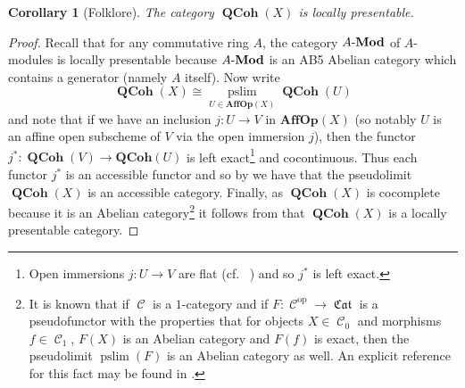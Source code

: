 \documentclass{amsart}
\newtheorem{corollary}[equation]{Corollary}
\theoremstyle{definition}
\DeclareMathOperator{\Cscr}{\mathscr{C}}
\DeclareMathOperator{\fCat}{\mathfrak{Cat}}
\DeclareMathOperator{\op}{op}
\DeclareMathOperator{\QCoh}{\mathbf{QCoh}}
\newcommand{\Mod}[1]{{#1}\textnormal{-}\mathbf{Mod}}
\numberwithin{equation}{subsection}
\begin{document}
\begin{corollary}[Folklore]\label{Cor: Section QCoh: QCoh Locally presentable}
	The category $\QCoh(X)$ is locally presentable.
\end{corollary}
\begin{proof}
	Recall that for any commutative ring $A$, the category $\Mod{A}$ of $A$-modules is locally presentable because $\Mod{A}$ is an AB5 Abelian category which contains a generator (namely $A$ itself). Now write
	\[
	\QCoh(X) \cong \operatorname*{pslim}_{U \in \mathbf{AffOp}(X)} \QCoh(U)
	\]
	and note that if we have an inclusion $j:U \to V$ in $\mathbf{AffOp}(X)$ (so notably $U$ is an affine open subscheme of $V$ via the open immersion $j$), then the functor $j^{\ast}:\QCoh(V) \to \mathbf{QCoh}(U)$ is left exact\footnote{Open immersions $j:U \to V$ are flat (cf.~ \cite[Proposition III.9.2]{Hartshorne}) and so $j^{\ast}$ is left exact.} and cocontinuous. Thus each functor $j^{\ast}$ is an accessible functor and so by \cite[Theorem 5.1.6, Corollary 5.1.8]{MakkaiPareAccess} we have that the pseudolimit $\QCoh(X)$ is an accessible category. Finally, as $\QCoh(X)$ is cocomplete because it is an Abelian category\footnote{It is known that if $\Cscr$ is a $1$-category and if $F:\Cscr^{\op} \to \fCat$ is a pseudofunctor with the properties that for objects $X \in \Cscr_0$ and morphisms $f \in \Cscr_1$, $F(X)$ is an Abelian category and $F(f)$ is exact, then the pseudolimit $\operatorname{pslim}(F)$ is an Abelian category as well. An explicit reference for this fact may be found in \cite[Proposition 3.1.12]{PseudoconeMonograph}.} it follows from \cite[Corollary 2.47]{AdamekRosicky} that $\QCoh(X)$ is a locally presentable category.
\end{proof}
\end{document}
